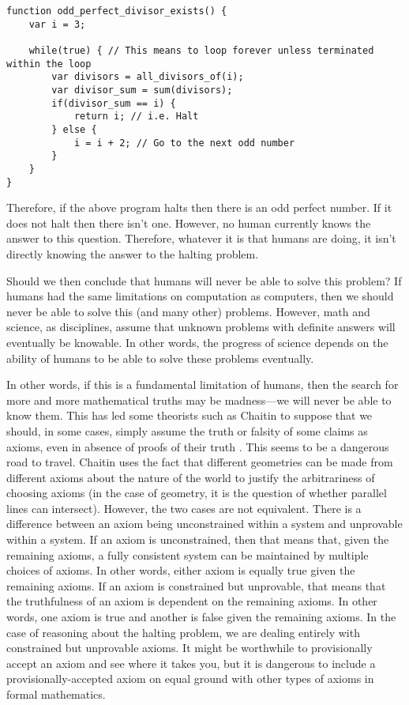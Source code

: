 \begin{verbatim}
function odd_perfect_divisor_exists() {
	var i = 3;

	while(true) { // This means to loop forever unless terminated within the loop
		var divisors = all_divisors_of(i);
		var divisor_sum = sum(divisors);
		if(divisor_sum == i) {
			return i; // i.e. Halt
		} else {
			i = i + 2; // Go to the next odd number
		}
	}
}
\end{verbatim}

Therefore, if the above program halts then there is an odd perfect number.  If it does not halt then there isn't one.  However, no human currently knows the answer to this question.  Therefore, whatever it is that humans are doing, it isn't directly knowing the answer to the halting problem.

Should we then conclude that humans will never be able to solve this problem?  If humans had the same limitations on computation as computers, then we should never be able to solve this (and many other) problems.  However, math and science, as disciplines, assume that unknown problems with definite answers will eventually be knowable.  In other words, the progress of science depends on the ability of humans to be able to solve these problems eventually.

In other words, if this is a fundamental limitation of humans, then the search for more and more mathematical truths may be madness---we will never be able to know them.  This has led some theorists such as Chaitin to suppose that we should, in some cases, simply assume the truth or falsity of some claims as axioms, even in absence of proofs of their truth \citep{chaitin2006}.  This seems to be a dangerous road to travel.  Chaitin uses the fact that different geometries can be made from different axioms about the nature of the world to justify the arbitrariness of choosing axioms (in the case of geometry, it is the question of whether parallel lines can intersect).  However, the two cases are not equivalent.  There is a difference between an axiom being unconstrained within a system and unprovable within a system.  If an axiom is unconstrained, then that means that, given the remaining axioms, a fully consistent system can be maintained by multiple choices of axioms.  In other words, either axiom is equally true given the remaining axioms.  If an axiom is constrained but unprovable, that means that the truthfulness of an axiom is dependent on the remaining axioms.  In other words, one axiom is true and another is false given the remaining axioms.  In the case of reasoning about the halting problem, we are dealing entirely with constrained but unprovable axioms.  It might be worthwhile to provisionally accept an axiom and see where it takes you, but it is dangerous to include a provisionally-accepted axiom on equal ground with other types of axioms in formal mathematics.

